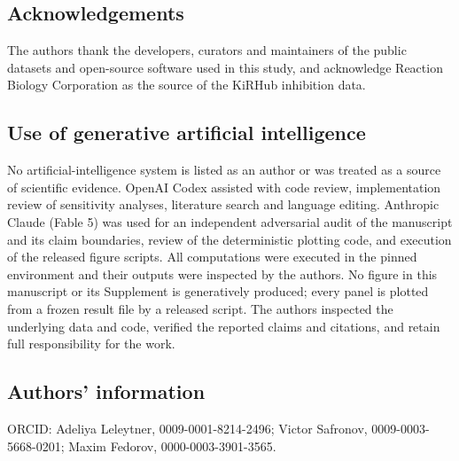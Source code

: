 \subsection*{Acknowledgements}

The authors thank the developers, curators and maintainers of the public
datasets and open-source software used in this study, and acknowledge Reaction
Biology Corporation as the source of the KiRHub inhibition data.

\subsection*{Use of generative artificial intelligence}

No artificial-intelligence system is listed as an author or was treated as a
source of scientific evidence. OpenAI Codex assisted with code review, implementation
review of sensitivity analyses, literature search and language editing. Anthropic Claude
(Fable 5) was used for an independent adversarial audit of the manuscript and its claim
boundaries, review of the deterministic plotting code, and execution of the released figure
scripts. All computations
were executed in the pinned environment and their outputs were inspected by the authors. No figure in this manuscript
or its Supplement is generatively produced; every panel is plotted from a frozen
result file by a released script.  The authors inspected the underlying data and
code, verified the reported claims and citations, and retain full responsibility
for the work.

\subsection*{Authors' information}

ORCID: Adeliya Leleytner, 0009-0001-8214-2496; Victor Safronov,
0009-0003-5668-0201; Maxim Fedorov, 0000-0003-3901-3565.

